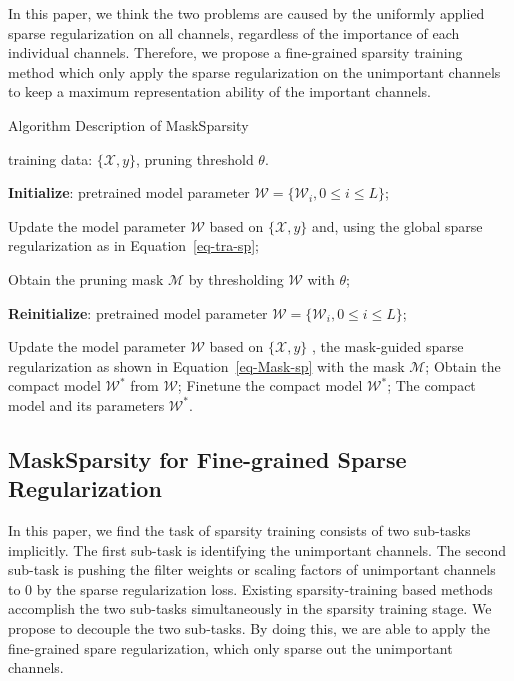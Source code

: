 \documentclass[review]{cvpr}
\begin{document}
In this paper, we think the two problems are caused by the uniformly applied sparse regularization on all channels, regardless of the importance of each individual channels. Therefore, we propose a fine-grained sparsity training method which only apply the sparse regularization on the unimportant channels to keep a maximum representation ability of the important channels. 
\begin{algorithm}[t]
	\caption{Algorithm Description of MaskSparsity}
	\label{alg:FPGM}
	
	\begin{algorithmic}[1]
		\INPUT training data: $\{\mathcal{X},y\}$, pruning threshold $\theta$.
		
		\State  \textbf{Initialize}: pretrained model parameter $\mathcal{W}=\{\mathcal{W} _{i}, 0\leq i \leq L\}$;  
		
		\State Update the model parameter $\mathcal{W}$ based on $\{\mathcal{X},y\}$ and, using the global sparse regularization as in Equation~\ref{eq-tra-sp};
		\EndFor
		
		\State Obtain the pruning mask $\mathcal{M}$ by thresholding $\mathcal{W}$ with $\theta$;
		
		\State  \textbf{Reinitialize}: pretrained model parameter $\mathcal{W}=\{\mathcal{W} _{i}, 0\leq i \leq L\}$;
		
		\State Update the model parameter $\mathcal{W}$ based on $\{\mathcal{X},y\}$ , the mask-guided sparse regularization as shown in Equation~\ref{eq-Mask-sp} with the mask $\mathcal{M}$;
		\EndFor
		\State Obtain the compact model $\mathcal{W} ^{*}$ from $\mathcal{W}$;
		\State Finetune the compact model $\mathcal{W} ^{*}$;
		\OUTPUT The compact model and its parameters $\mathcal{W} ^{*}$.
	\end{algorithmic} 
\end{algorithm}
\subsection{MaskSparsity for Fine-grained Sparse Regularization}\label{MaskSP}

In this paper, we find the task of sparsity training consists of two sub-tasks implicitly. The first sub-task is identifying the unimportant channels. The second sub-task is pushing the filter weights or scaling factors of unimportant channels to 0 by the sparse regularization loss. Existing sparsity-training based methods accomplish the two sub-tasks simultaneously in the sparsity training stage. We propose to decouple the two sub-tasks. By doing this, we are able to apply the fine-grained spare regularization, which only sparse out the unimportant channels.
\end{document}
